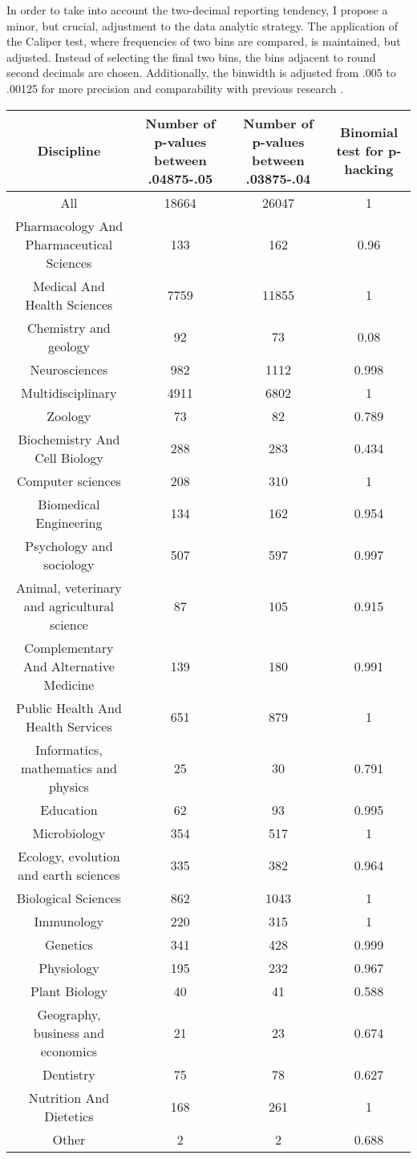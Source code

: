 In order to take into account the two-decimal reporting tendency, I propose a minor, but crucial, adjustment to the data analytic strategy. The application of the Caliper test, where frequencies of two bins are compared, is maintained, but adjusted. Instead of selecting the final two bins, the bins adjacent to round second decimals are chosen. Additionally, the binwidth is adjusted from .005 to .00125 for more precision and comparability with previous research \cite{Masicampo2012, Leggett2013}.
\begin{tabular}{ c c c c}
    \toprule
    Discipline & Number of p-values between .04875-.05 & Number of p-values between .03875-.04 & Binomial test for p-hacking \\
    \midrule
    All   & 18664 & 26047 & 1 \\
    Pharmacology And Pharmaceutical Sciences & 133   & 162   & 0.96 \\
    Medical And Health Sciences & 7759  & 11855 & 1 \\
    Chemistry and geology & 92    & 73    & 0.08 \\
    Neurosciences & 982   & 1112  & 0.998 \\
    Multidisciplinary & 4911  & 6802  & 1 \\
    Zoology & 73    & 82    & 0.789 \\
    Biochemistry And Cell Biology & 288   & 283   & 0.434 \\
    Computer sciences & 208   & 310   & 1 \\
    Biomedical Engineering & 134   & 162   & 0.954 \\
    Psychology and sociology & 507   & 597   & 0.997 \\
    Animal, veterinary and agricultural science & 87    & 105   & 0.915 \\
    Complementary And Alternative Medicine & 139   & 180   & 0.991 \\
    Public Health And Health Services & 651   & 879   & 1 \\
    Informatics, mathematics and physics & 25    & 30    & 0.791 \\
    Education & 62    & 93    & 0.995 \\
    Microbiology & 354   & 517   & 1 \\
    Ecology, evolution and earth sciences & 335   & 382   & 0.964 \\
    Biological Sciences & 862   & 1043  & 1 \\
    Immunology & 220   & 315   & 1 \\
    Genetics & 341   & 428   & 0.999 \\
    Physiology & 195   & 232   & 0.967 \\
    Plant Biology & 40    & 41    & 0.588 \\
    Geography, business and economics & 21    & 23    & 0.674 \\
    Dentistry & 75    & 78    & 0.627 \\
    Nutrition And Dietetics & 168   & 261   & 1 \\
    Other & 2     & 2     & 0.688 \\
    \bottomrule
    \end{tabular}%
